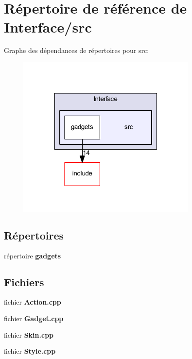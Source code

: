 \section{Répertoire de référence de Interface/src}
\label{dir_20fba0f554df9fec5e395dcb0e4131a5}
Graphe des dépendances de répertoires pour src\+:\nopagebreak
\begin{figure}[H]
\begin{center}
\leavevmode
\includegraphics[width=254pt]{dir_20fba0f554df9fec5e395dcb0e4131a5_dep}
\end{center}
\end{figure}
\subsection*{Répertoires}
\begin{DoxyCompactItemize}
\item 
répertoire {\bf gadgets}
\end{DoxyCompactItemize}
\subsection*{Fichiers}
\begin{DoxyCompactItemize}
\item 
fichier {\bf Action.\+cpp}
\item 
fichier {\bf Gadget.\+cpp}
\item 
fichier {\bf Skin.\+cpp}
\item 
fichier {\bf Style.\+cpp}
\end{DoxyCompactItemize}
